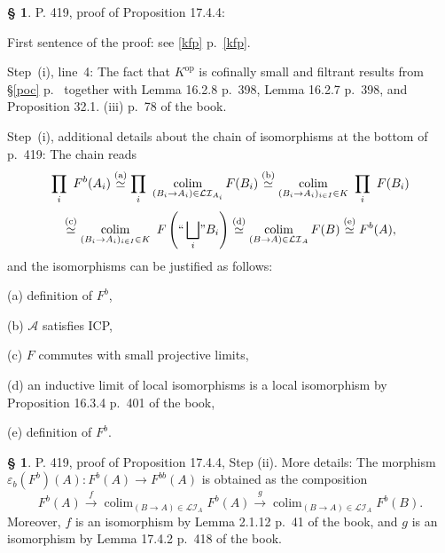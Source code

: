 \documentclass[12pt]{article}%
\theoremstyle{remark}
\theoremstyle{definition}
\newtheorem{s}[thm]{\S}%
\newcommand{\nn}{\noindent}
\newcommand{\cc}{\mathcal}
\newcommand{\A}{\mathcal A}
\newcommand{\ee}{\varepsilon}
\newcommand{\xr}{\xrightarrow}
\DeclareMathOperator*{\col}{colim}
\DeclareMathOperator{\op}{op}
\begin{document}
%

\begin{s}\label{1744i}
P. 419, proof of Proposition 17.4.4: 

First sentence of the proof: see \eqref{kfp} p.~\ref{kfp}. 

Step~(i), line~4: The fact that $K^{\op}$ is cofinally small and filtrant results from \S\ref{poc} p.~\pageref{poc} together with Lemma 16.2.8 p.~398, Lemma 16.2.7 p.~398, and Proposition 32.1. (iii) p.~78 of the book. 

Step~(i), additional details about the chain of isomorphisms at the bottom of p.~419: The chain reads 
$$
\prod_i\ F^b(A_i)
\overset{(\text a)}{\simeq}\prod_i\ \col_{(B_i\to A_i)\in\cc{LI}_{A_i}}F(B_i)
\overset{(\text b)}{\simeq}\col_{(B_i\to A_i)_{i\in I}\in K}\ \prod_i\ F(B_i)
$$
$$
\overset{(\text c)}{\simeq}\col_{(B_i\to A_i)_{i\in I}\in K}\ F\left(``\bigsqcup_i\!"B_i\right)
\overset{(\text d)}{\simeq}\col_{(B\to A)\in\cc{LI}_A}F(B)
\overset{(\text e)}{\simeq}F^b(A), 
$$ 
and the isomorphisms can be justified as follows: 

\nn(a) definition of $F^b$, 

\nn(b) $\A$ satisfies ICP,

\nn(c) $F$ commutes with small projective limits, 

\nn(d) an inductive limit of local isomorphisms is a local isomorphism by Proposition 16.3.4 p.~401 of the book, 

\nn(e) definition of $F^b$. 
\end{s} 

%

\begin{s}%
P. 419, proof of Proposition 17.4.4, Step (ii). More details: The morphism $\ee_b(F^b)(A):F^b(A)\to F^{bb}(A)$ is obtained as the composition 
$$
F^b(A)\xr f\col_{(B\to A)\in\cc{LI}_A}F^b(A)\xr g\col_{(B\to A)\in\cc{LI}_A}F^b(B). 
$$ 
Moreover, $f$ is an isomorphism by Lemma 2.1.12 p.~41 of the book, and $g$ is an isomorphism by Lemma 17.4.2 p.~418 of the book.
\end{s}

%
\end{document}
